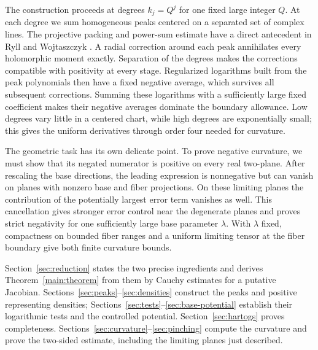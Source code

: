 The construction proceeds at degrees $k_j=Q^j$ for one fixed large
integer $Q$. At each degree we sum homogeneous peaks centered on a
separated set of complex lines. The projective packing and power-sum
estimate have a direct antecedent in Ryll and Wojtaszczyk
\cite[Section~2]{RyllWojtaszczyk1983}. A radial correction around each
peak annihilates every holomorphic moment exactly. Separation of the
degrees makes the corrections compatible with positivity at every
stage. Regularized logarithms built from the peak polynomials then have a
fixed negative average, which survives all subsequent corrections.
Summing these logarithms with a sufficiently large fixed coefficient
makes their negative averages dominate the boundary allowance.
Low degrees vary little
in a centered chart, while high degrees are exponentially small;
this gives the uniform derivatives through order four needed for
curvature.

The geometric task has its own delicate point. To prove negative
curvature, we must show that its negated numerator is positive on every
real two-plane. After rescaling the base directions, the leading
expression is nonnegative but can vanish on planes with nonzero base
and fiber projections. On these limiting planes the contribution of the
potentially largest error term vanishes as well. This cancellation gives stronger error
control near the degenerate planes and proves strict negativity for
one sufficiently large base parameter $\lambda$.
With $\lambda$ fixed, compactness on bounded
fiber ranges and a uniform limiting tensor at the fiber boundary give
both finite curvature bounds.

Section~\ref{sec:reduction} states the two precise ingredients and derives
Theorem~\ref{main:theorem} from them by Cauchy estimates for a putative
Jacobian. Sections~\ref{sec:peaks}--\ref{sec:densities} construct the
peaks and positive representing densities;
Sections~\ref{sec:tests}--\ref{sec:base-potential} establish their
logarithmic tests and the controlled potential.
Section~\ref{sec:hartogs} proves completeness.
Sections~\ref{sec:curvature}--\ref{sec:pinching} compute the curvature
and prove the two-sided estimate, including the limiting planes just
described.
